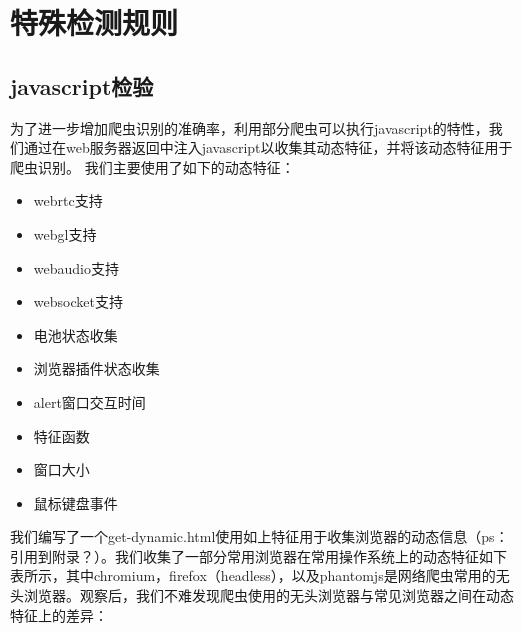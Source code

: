 \documentclass[doctor,privacy,twoside]{buaa_mac}
\begin{document}
\section{特殊检测规则}
\subsection{javascript检验}

为了进一步增加爬虫识别的准确率，利用部分爬虫可以执行javascript的特性，我们通过在web服务器返回中注入javascript以收集其动态特征，并将该动态特征用于爬虫识别。
我们主要使用了如下的动态特征：

\begin{itemize}
\item webrtc支持
\item webgl支持
\item webaudio支持
\item websocket支持
\item 电池状态收集
\item 浏览器插件状态收集
\item alert窗口交互时间
\item 特征函数
\item 窗口大小
\item 鼠标键盘事件
\end{itemize}

我们编写了一个get-dynamic.html使用如上特征用于收集浏览器的动态信息（ps：引用到附录？）。我们收集了一部分常用浏览器在常用操作系统上的动态特征如下表所示，其中chromium，firefox（headless），以及phantomjs是网络爬虫常用的无头浏览器。观察后，我们不难发现爬虫使用的无头浏览器与常见浏览器之间在动态特征上的差异：
\end{document}
